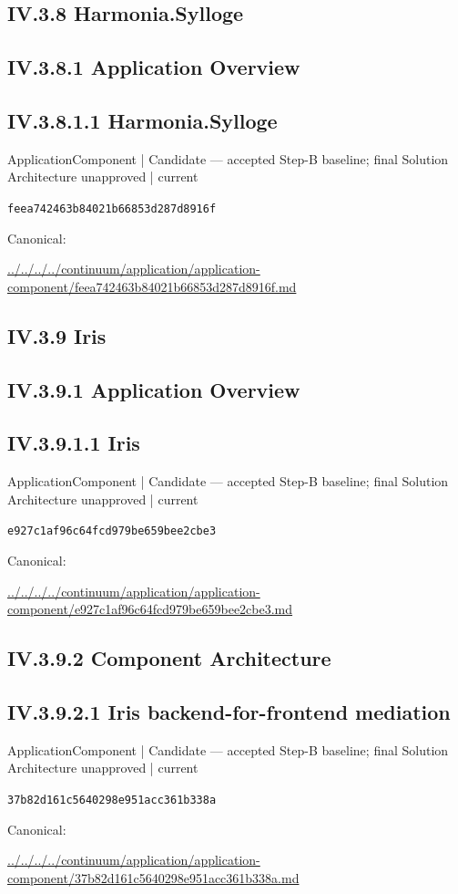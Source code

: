 \documentclass[10pt,a4paper]{article}
\begin{document}
\subsection*{IV.3.8 Harmonia.Sylloge}
\subsection*{IV.3.8.1 Application Overview}
\subsection*{IV.3.8.1.1 Harmonia.Sylloge}
{\small ApplicationComponent | Candidate — accepted Step-B baseline; final Solution Architecture unapproved | current}\par
\texttt{feea742463b84021b66853d287d8916f}\par
Canonical: \par
{\footnotesize\url{../../../../continuum/application/application-component/feea742463b84021b66853d287d8916f.md}}\par
\subsection*{IV.3.9 Iris}
\subsection*{IV.3.9.1 Application Overview}
\subsection*{IV.3.9.1.1 Iris}
{\small ApplicationComponent | Candidate — accepted Step-B baseline; final Solution Architecture unapproved | current}\par
\texttt{e927c1af96c64fcd979be659bee2cbe3}\par
Canonical: \par
{\footnotesize\url{../../../../continuum/application/application-component/e927c1af96c64fcd979be659bee2cbe3.md}}\par
\subsection*{IV.3.9.2 Component Architecture}
\subsection*{IV.3.9.2.1 Iris backend-for-frontend mediation}
{\small ApplicationComponent | Candidate — accepted Step-B baseline; final Solution Architecture unapproved | current}\par
\texttt{37b82d161c5640298e951acc361b338a}\par
Canonical: \par
{\footnotesize\url{../../../../continuum/application/application-component/37b82d161c5640298e951acc361b338a.md}}\par
\end{document}
